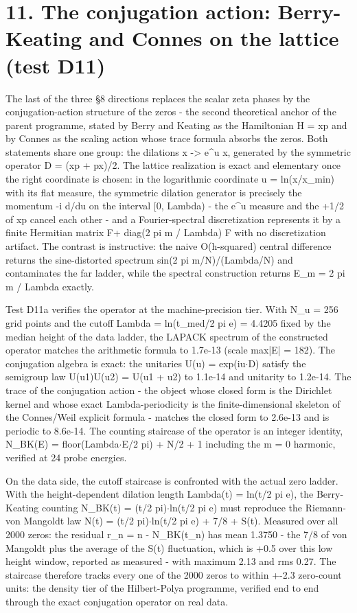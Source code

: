 \documentclass[11pt,a4paper]{article}
\begin{document}
\section{11. The conjugation action: Berry-Keating and Connes on the lattice (test D11)}
The last of the three \S{}8 directions replaces the scalar zeta phases by the conjugation-action structure of the zeros - the second theoretical anchor of the parent programme, stated by Berry and Keating as the Hamiltonian H = xp and by Connes as the scaling action whose trace formula absorbs the zeros. Both statements share one group: the dilations x -> e\^{}u x, generated by the symmetric operator D = (xp + px)/2. The lattice realization is exact and elementary once the right coordinate is chosen: in the logarithmic coordinate u = ln(x/x\_\allowbreak{}min) with its flat measure, the symmetric dilation generator is precisely the momentum -i d/du on the interval [0, Lambda) - the e\^{}u measure and the +1/2 of xp cancel each other - and a Fourier-spectral discretization represents it by a finite Hermitian matrix F+ diag(2 pi m / Lambda) F with no discretization artifact. The contrast is instructive: the naive O(h-squared) central difference returns the sine-distorted spectrum sin(2 pi m/N)/(Lambda/N) and contaminates the far ladder, while the spectral construction returns E\_\allowbreak{}m = 2 pi m / Lambda exactly.

Test D11a verifies the operator at the machine-precision tier. With N\_\allowbreak{}u = 256 grid points and the cutoff Lambda = ln(t\_\allowbreak{}med/2 pi e) = 4.4205 fixed by the median height of the data ladder, the LAPACK spectrum of the constructed operator matches the arithmetic formula to 1.7e-13 (scale max|E| = 182). The conjugation algebra is exact: the unitaries U(u) = exp(iu$\cdot$D) satisfy the semigroup law U(u1)U(u2) = U(u1 + u2) to 1.1e-14 and unitarity to 1.2e-14. The trace of the conjugation action - the object whose closed form is the Dirichlet kernel and whose exact Lambda-periodicity is the finite-dimensional skeleton of the Connes/Weil explicit formula - matches the closed form to 2.6e-13 and is periodic to 8.6e-14. The counting staircase of the operator is an integer identity, N\_\allowbreak{}BK(E) = floor(Lambda$\cdot$E/2 pi) + N/2 + 1 including the m = 0 harmonic, verified at 24 probe energies.

On the data side, the cutoff staircase is confronted with the actual zero ladder. With the height-dependent dilation length Lambda(t) = ln(t/2 pi e), the Berry-Keating counting N\_\allowbreak{}BK(t) = (t/2 pi)$\cdot$ln(t/2 pi e) must reproduce the Riemann-von Mangoldt law N(t) = (t/2 pi)$\cdot$ln(t/2 pi e) + 7/8 + S(t). Measured over all 2000 zeros: the residual r\_\allowbreak{}n = n - N\_\allowbreak{}BK(t\_\allowbreak{}n) has mean 1.3750 - the 7/8 of von Mangoldt plus the average of the S(t) fluctuation, which is +0.5 over this low height window, reported as measured - with maximum 2.13 and rms 0.27. The staircase therefore tracks every one of the 2000 zeros to within +-2.3 zero-count units: the density tier of the Hilbert-Polya programme, verified end to end through the exact conjugation operator on real data.
\end{document}

